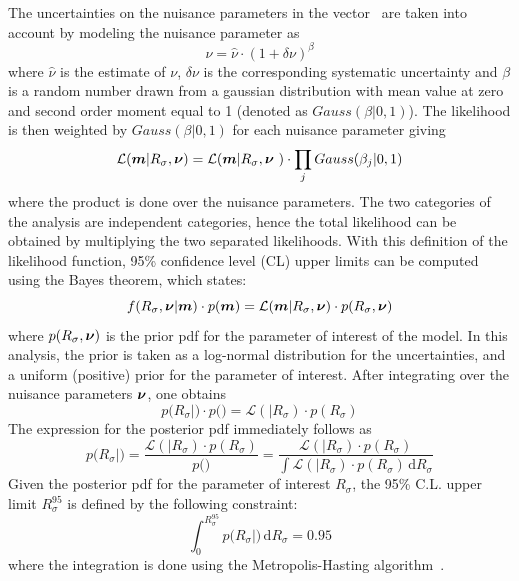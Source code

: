 The uncertainties on the nuisance parameters in the vector \bnu\ are taken into account by modeling the nuisance parameter as
\begin{equation}
\label{eq:nu}
\nu = \hat{\nu} \cdot (1 + \delta\nu)^{\beta}
\end{equation}
where $\hat{\nu}$ is the estimate of $\nu$, $\delta\nu$ is the corresponding systematic uncertainty and $\beta$ is a random number drawn from a gaussian distribution with mean value at zero and second order moment equal to 1 (denoted as $Gauss(\beta|0,1)$). The likelihood is then weighted by $Gauss(\beta|0,1)$ for each nuisance parameter giving
\begin{equation}
\mathcal{L}( {\boldsymbol m} \vert R_\sigma, {\boldsymbol\nu}) = \mathcal{L}( {\boldsymbol m} \vert R_\sigma, {\boldsymbol\nu}\ )\cdot \prod_{j}Gauss(\beta_j|0,1)
\end{equation}
where the product is done over the nuisance parameters. The two categories of the analysis are independent categories, hence the total likelihood can be obtained by multiplying the two separated likelihoods. With this definition of the likelihood function, 95\% confidence level (CL) upper limits can be computed using the Bayes theorem, which states:
\begin{equation}
f(R_\sigma,{\boldsymbol\nu}|{\boldsymbol m}) \cdot p({\boldsymbol m}) =
\mathcal{L}({\boldsymbol m}|R_\sigma,{\boldsymbol\nu}) \cdot p(R_\sigma,{\boldsymbol\nu})
\end{equation}
where $p(R_\sigma,{\boldsymbol\nu})$ is the prior pdf for the parameter of interest of the model. In this analysis, the prior is taken as a log-normal distribution for the uncertainties, and a uniform (positive) prior for the parameter of interest. After integrating over the nuisance parameters ${\boldsymbol\nu}$, one obtains
\begin{equation}
p(R_\sigma|\bm) \cdot p(\bm) =
\mathcal{L}(\bm|R_\sigma) \cdot p(R_\sigma)
\end{equation}
The expression for the posterior pdf immediately follows as
\begin{equation}
p(R_\sigma|\bm) =
  \frac{\mathcal{L}(\bm|R_\sigma) \cdot p(R_\sigma)}{p(\bm)} =
  \frac{\mathcal{L}(\bm|R_\sigma) \cdot p(R_\sigma)}{\int\mathcal{L}(\bm|R_\sigma) \cdot p(R_\sigma)\,\mathrm{d}R_\sigma}
\end{equation}
Given the posterior pdf for the parameter of interest $R_\sigma$,
the 95\% C.L. upper limit $R_\sigma^{95}$ is defined by the following constraint:
\begin{equation}
\label{eq:ul}
\int_0^{R_\sigma^{95}}p(R_\sigma|\bm)\,\mathrm{d}R_\sigma = 0.95
\end{equation}
where the integration is done using the Metropolis-Hasting algorithm~\cite{Metropolis,HASTINGS01041970}.

